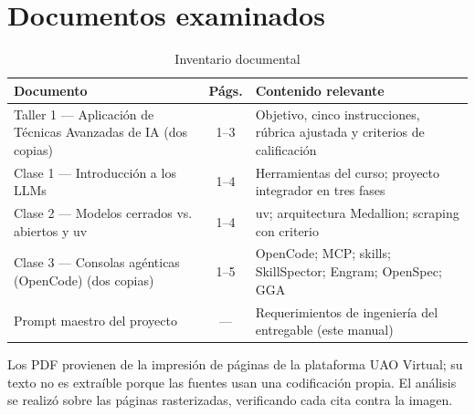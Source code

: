 \section{Documentos examinados}
\begin{table}[H]\centering\small
\caption{Inventario documental}\label{tab:documentos}
\begin{tabularx}{\linewidth}{@{}l c X@{}}\toprule
Documento & Págs. & Contenido relevante\\\midrule
Taller 1 --- Aplicación de Técnicas Avanzadas de IA (dos copias) & 1--3 & Objetivo, cinco instrucciones,
rúbrica ajustada y criterios de calificación\\
Clase 1 --- Introducción a los LLMs & 1--4 & Herramientas del curso; proyecto integrador en tres fases\\
Clase 2 --- Modelos cerrados vs. abiertos y uv & 1--4 & uv; arquitectura Medallion; scraping con criterio\\
Clase 3 --- Consolas agénticas (OpenCode) (dos copias) & 1--5 & OpenCode; MCP; skills; SkillSpector; Engram;
OpenSpec; GGA\\
Prompt maestro del proyecto & --- & Requerimientos de ingeniería del entregable (este manual)\\\bottomrule
\end{tabularx}
\end{table}
Los PDF provienen de la impresión de páginas de la plataforma UAO Virtual; su texto no es extraíble porque las
fuentes usan una codificación propia. El análisis se realizó sobre las páginas rasterizadas, verificando cada
cita contra la imagen.

